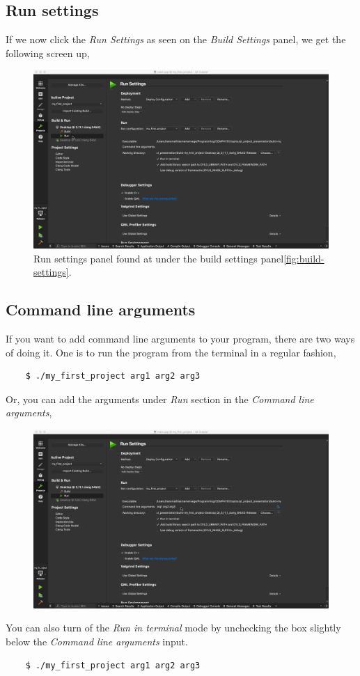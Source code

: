 \documentclass[11pt]{article}
\begin{document}
\subsection{Run settings}
If we now click the \textit{Run Settings} as seen on the \textit{Build Settings} panel, we get the following screen up,
\begin{figure}[H]
    \centering
    \includegraphics[width=\textwidth]{figures/changing_build_settings/run_settings_panel.png}
    \caption{Run settings panel found at under the build settings panel\ref{fig:build-settings}.}
    \label{fig:run-settings}
\end{figure}
\subsection{Command line arguments}
If you want to add command line arguments to your program, there are two ways of doing it. One is to run the program from the terminal in a regular fashion,
\begin{lstlisting}
    $ ./my_first_project arg1 arg2 arg3 
\end{lstlisting}
Or, you can add the arguments under \textit{Run} section in the \textit{Command line arguments},
\begin{figure}[H]
    \centering
    \includegraphics[width=\textwidth]{figures/changing_build_settings/arguments.png}
\end{figure}
You can also turn of the \textit{Run in terminal} mode by unchecking the box slightly below the \textit{Command line arguments} input.
\begin{lstlisting}
    $ ./my_first_project arg1 arg2 arg3 
\end{lstlisting}
\end{document}
